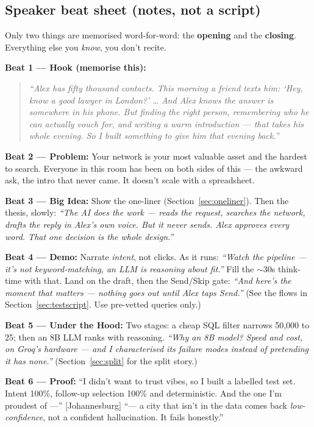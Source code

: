\documentclass[11pt, a4paper]{article}
\begin{document}
\subsection{Speaker beat sheet (notes, not a script)}
Only two things are memorised word-for-word: the \textbf{opening} and the \textbf{closing}. Everything else you \emph{know}, you don't recite.

\textbf{Beat 1 --- Hook (memorise this):}
\begin{quote}\itshape
``Alex has fifty thousand contacts. This morning a friend texts him: `Hey, know a good lawyer in London?' \ldots{} And Alex knows the answer is somewhere in his phone. But finding the right person, remembering who he can actually vouch for, and writing a warm introduction --- that takes his whole evening. \quad[pause]\quad So I built something to give him that evening back.''
\end{quote}

\textbf{Beat 2 --- Problem:} Your network is your most valuable asset and the hardest to search. Everyone in this room has been on both sides of this --- the awkward ask, the intro that never came. It doesn't scale with a spreadsheet.

\textbf{Beat 3 --- Big Idea:} Show the one-liner (Section~\ref{sec:oneliner}). Then the thesis, slowly: \emph{``The AI does the work --- reads the request, searches the network, drafts the reply in Alex's own voice. But it never sends. Alex approves every word. That one decision is the whole design.''}

\textbf{Beat 4 --- Demo:} Narrate \emph{intent}, not clicks. As it runs: \emph{``Watch the pipeline --- it's not keyword-matching, an LLM is reasoning about fit.''} Fill the $\sim$30s think-time with that. Land on the draft, then the Send/Skip gate: \emph{``And here's the moment that matters --- nothing goes out until Alex taps Send.''} (See the flows in Section~\ref{sec:testscript}. Use pre-vetted queries only.)

\textbf{Beat 5 --- Under the Hood:} Two stages: a cheap SQL filter narrows 50{,}000 to 25; then an 8B LLM ranks with reasoning. \emph{``Why an 8B model? Speed and cost, on Groq's hardware --- and I characterised its failure modes instead of pretending it has none.''} (Section~\ref{sec:split} for the split story.)

\textbf{Beat 6 --- Proof:} ``I didn't want to trust vibes, so I built a labelled test set. Intent 100\%, follow-up selection 100\% and deterministic. And the one I'm proudest of ---'' [Johannesburg] ``--- a city that isn't in the data comes back \emph{low-confidence}, not a confident hallucination. It fails honestly.''
\end{document}
